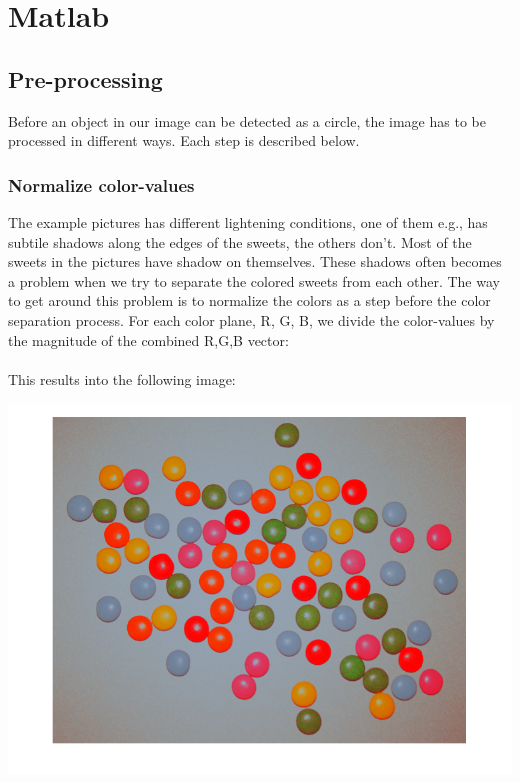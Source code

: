 \lstset{language=Matlab}
\lstset{frame=single}
\section{Matlab}
\subsection{Pre-processing}
Before an object in our image can be detected as a circle, the image has to be processed in different ways. Each step is described below.

\subsubsection{Normalize color-values}
The example pictures has different lightening conditions, one of them e.g., has subtile shadows along the edges of the sweets, the others don't. Most of the sweets in the pictures have shadow on themselves. These shadows often becomes a problem when we try to separate the colored sweets from each other. The way to get around this problem is to normalize the colors as a step before the color separation process. For each color plane, R, G, B, we divide the color-values by the magnitude of the combined R,G,B vector:
\\

\mbox{}\\
This results into the following image:
\\
\centerline{\includegraphics[scale=0.3]{../results/sweetsA03_normalized_colors.png}}
\mbox{}\\

